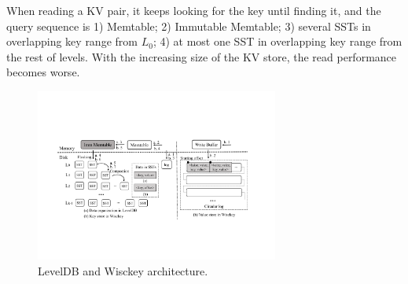 \documentclass[sigconf]{acmart}
\begin{document}
When reading a KV pair, it keeps looking for the key until finding it, and the query sequence is 1) Memtable; 2) Immutable Memtable; 3) several SSTs in overlapping key range from $L_0$; 4) at most one SST in overlapping key range from the rest of levels. With the increasing size of the KV store, the read performance becomes worse.





\begin{figure}[!t]
	\setlength{\abovecaptionskip}{0.cm}	
	\setlength{\belowcaptionskip}{-0.cm}
	\centerline{\includegraphics[width=80mm]{lsm_wisckey.pdf}}
	\caption{LevelDB and Wisckey architecture.}
	\label{fig::lsm_wisckey}
\end{figure}
\end{document}
